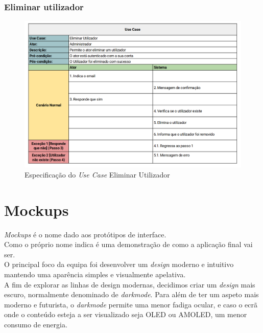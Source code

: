 \documentclass[a4paper]{report}
\begin{document}
\subsection{Eliminar utilizador}
\begin{figure}[H]
	\centering 
    \includegraphics[width=\textwidth]{images/Remover_Conta.png}  
    \caption{Especificação do \emph{Use Case} Eliminar Utilizador}
\end{figure}

\chapter{Mockups}
\textit{Mockups} é o nome dado aos protótipos de interface.\\
Como o próprio nome indica é uma demonstração de como a aplicação final vai
ser.\\
O principal foco da equipa foi desenvolver um \textit{design} moderno e
intuitivo mantendo uma aparência simples e visualmente apelativa.\\
A fim de explorar as linhas de design modernas, decidimos criar um
\textit{design} mais escuro, normalmente denominado de \textit{darkmode}. Para
além de ter um aspeto mais moderno e futurista, o \textit{darkmode} permite uma
menor fadiga ocular, e caso o ecrã onde o conteúdo esteja a ser visualizado seja
OLED ou AMOLED, um menor consumo de energia.
\end{document}
